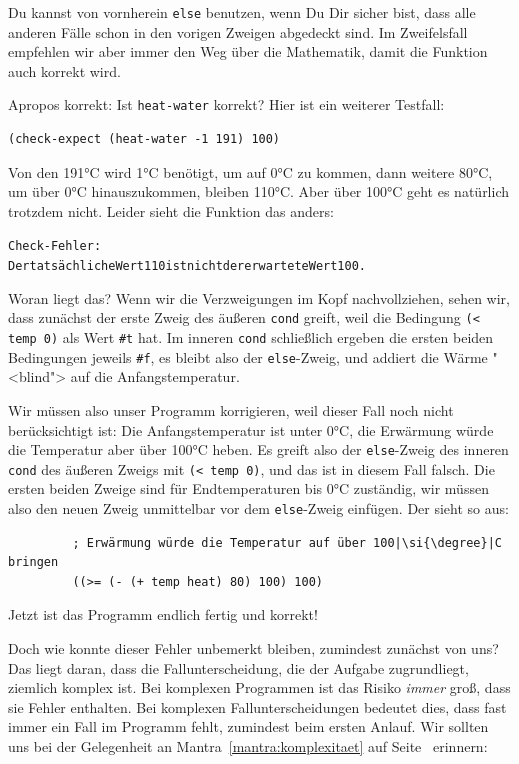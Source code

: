 Du kannst von vornherein \lstinline{else} benutzen, wenn Du Dir
sicher bist, dass alle anderen Fälle schon in den vorigen Zweigen
abgedeckt sind.  Im Zweifelsfall empfehlen wir aber immer den Weg über
die Mathematik, damit die Funktion auch korrekt wird.

Apropos korrekt: Ist \lstinline{heat-water} korrekt?  Hier ist ein
weiterer Testfall:
%
\begin{lstlisting}
(check-expect (heat-water -1 191) 100)
\end{lstlisting}
%
Von den 191\si{\degree}C wird 1\si{\degree}C benötigt, um auf 0\si{\degree}C zu kommen, dann weitere
80\si{\degree}C, um über 0\si{\degree}C hinauszukommen, bleiben 110\si{\degree}C.  Aber über 100\si{\degree}C geht
es natürlich trotzdem nicht.  Leider sieht die Funktion das anders:
%
\begin{alltt}
Check-Fehler:
	Der tatsächliche Wert 110 ist nicht der erwartete Wert 100.
\end{alltt}
%
Woran liegt das?  Wenn wir die Verzweigungen im Kopf nachvollziehen,
sehen wir, dass zunächst der erste Zweig des äußeren \lstinline{cond}
greift, weil die Bedingung \lstinline{(< temp 0)} als Wert \lstinline{#t} hat.
Im inneren \lstinline{cond} schließlich ergeben die ersten beiden
Bedingungen jeweils \lstinline{#f}, es bleibt also der \lstinline{else}-Zweig,
und addiert die Wärme "<blind"> auf die Anfangstemperatur.

Wir müssen also unser Programm korrigieren, weil dieser Fall noch
nicht berücksichtigt ist: Die Anfangstemperatur ist unter 0\si{\degree}C, die
Erwärmung würde die Temperatur aber über 100\si{\degree}C heben.  Es greift also
der \lstinline{else}-Zweig des inneren \lstinline{cond} des äußeren Zweigs
mit \lstinline{(< temp 0)}, und das ist in diesem Fall falsch.  Die
ersten beiden Zweige sind für Endtemperaturen bis 0\si{\degree}C zuständig, wir
müssen also den neuen Zweig unmittelbar vor dem \lstinline{else}-Zweig
einfügen.  Der sieht so aus:
%
\begin{lstlisting}
         ; Erwärmung würde die Temperatur auf über 100|\si{\degree}|C bringen
         ((>= (- (+ temp heat) 80) 100) 100)
\end{lstlisting}
%
Jetzt ist das Programm endlich fertig und korrekt!

Doch wie konnte dieser Fehler unbemerkt bleiben, zumindest zunächst
von uns?  Das liegt daran, dass die Fallunterscheidung, die der
Aufgabe zugrundliegt, ziemlich komplex ist.  Bei komplexen Programmen
ist das Risiko \emph{immer} groß, dass sie Fehler enthalten.  Bei
komplexen Fallunterscheidungen bedeutet dies, dass fast immer ein Fall
im Programm fehlt, zumindest beim ersten Anlauf.  Wir sollten uns bei
der Gelegenheit an Mantra~\ref{mantra:komplexitaet} auf
Seite~\pageref{mantra:komplexitaet} erinnern:

